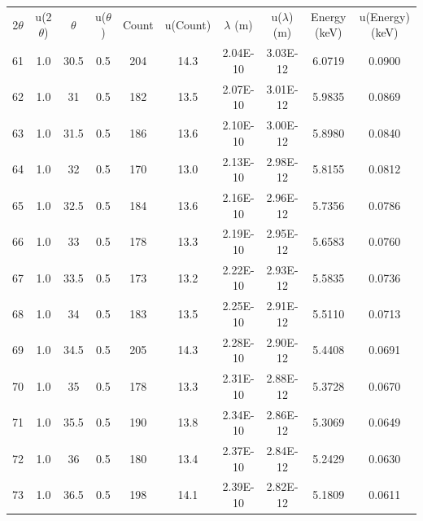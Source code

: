 \begin{maintable}[ht]
\center
\begin{tabular}{cccccccccc}
\multicolumn{1}{c}{2$\theta$} & \multicolumn{1}{c}{u(2$\theta$)} & \multicolumn{1}{c}{$\theta$} & \multicolumn{1}{c}{u($\theta$)} & \multicolumn{1}{c}{Count} & \multicolumn{1}{c}{u(Count)} & \multicolumn{1}{c}{$\lambda$ (m)} & \multicolumn{1}{c}{u($\lambda$) (m)} & \multicolumn{1}{c}{Energy (keV)} & \multicolumn{1}{c}{u(Energy) (keV)} \\
61          & 1.0   & 30.5       & 0.5           & 204     & 14.3       & 2.04E-10    & 3.03E-12       & 6.0719    & 0.0900       \\
62          & 1.0   & 31         & 0.5           & 182     & 13.5       & 2.07E-10    & 3.01E-12       & 5.9835    & 0.0869       \\
63          & 1.0   & 31.5       & 0.5           & 186     & 13.6       & 2.10E-10    & 3.00E-12       & 5.8980    & 0.0840       \\
64          & 1.0   & 32         & 0.5           & 170     & 13.0       & 2.13E-10    & 2.98E-12       & 5.8155    & 0.0812       \\
65          & 1.0   & 32.5       & 0.5           & 184     & 13.6       & 2.16E-10    & 2.96E-12       & 5.7356    & 0.0786       \\
66          & 1.0   & 33         & 0.5           & 178     & 13.3       & 2.19E-10    & 2.95E-12       & 5.6583    & 0.0760       \\
67          & 1.0   & 33.5       & 0.5           & 173     & 13.2       & 2.22E-10    & 2.93E-12       & 5.5835    & 0.0736       \\
68          & 1.0   & 34         & 0.5           & 183     & 13.5       & 2.25E-10    & 2.91E-12       & 5.5110    & 0.0713       \\
69          & 1.0   & 34.5       & 0.5           & 205     & 14.3       & 2.28E-10    & 2.90E-12       & 5.4408    & 0.0691       \\
70          & 1.0   & 35         & 0.5           & 178     & 13.3       & 2.31E-10    & 2.88E-12       & 5.3728    & 0.0670       \\
71          & 1.0   & 35.5       & 0.5           & 190     & 13.8       & 2.34E-10    & 2.86E-12       & 5.3069    & 0.0649       \\
72          & 1.0   & 36         & 0.5           & 180     & 13.4       & 2.37E-10    & 2.84E-12       & 5.2429    & 0.0630       \\
73          & 1.0   & 36.5       & 0.5           & 198     & 14.1       & 2.39E-10    & 2.82E-12       & 5.1809    & 0.0611       \\

\end{tabular}
\end{maintable}
